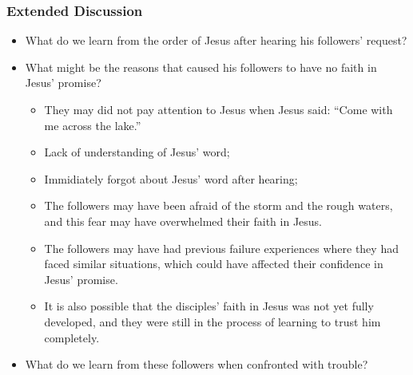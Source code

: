 \subsubsection{Extended Discussion}
\begin{itemize}
\item What do we learn from the order of Jesus after hearing his followers' request?
\item What might be the reasons that caused his followers to have no faith in Jesus' promise?
\begin{itemize}
\item They may did not pay attention to Jesus when Jesus said: “Come with me across the lake.” 
\item Lack of understanding of Jesus' word;
\item Immidiately forgot about Jesus' word after hearing;
\item The followers may have been afraid of the storm and the rough waters, and this fear may have overwhelmed their faith in Jesus.
\item The followers may have had previous failure experiences where they had faced similar situations, which could have affected their confidence in Jesus' promise.
\item It is also possible that the disciples' faith in Jesus was not yet fully developed, and they were still in the process of learning to trust him completely.
\end{itemize}
\item What do we learn from these followers when confronted with trouble?
\end{itemize}




